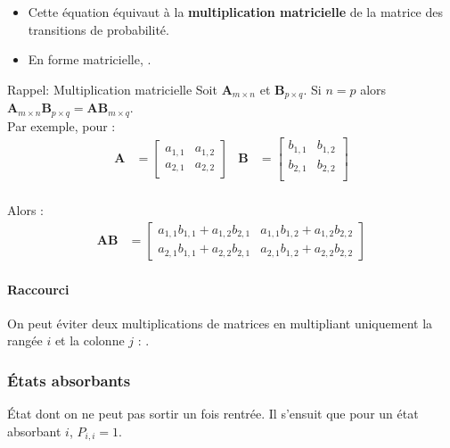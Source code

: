 \documentclass[10pt, french]{article}
\begin{document}
\begin{multicols*}{2}
\begin{definitionNOHFILLprop}
\begin{itemize}
	\item	Cette équation équivaut à la \textbf{multiplication matricielle} de la matrice des transitions de probabilité.
	\item	En forme matricielle, .
\end{itemize}
\end{definitionNOHFILLprop}

\begin{rappel}{Rappel: Multiplication matricielle}
Soit $\bm{A}_{m \times n}$ et $\bm{B}_{p \times q}$. Si $n = p$ alors $\bm{A}_{m \times n} \bm{B}_{p \times q} = \bm{AB}_{m \times q}$.\\

Par exemple, pour :
\begin{align*}
	\bm{A}
	&=	\begin{bmatrix}
		a_{1, 1}	&	a_{1, 2}	\\
		a_{2, 1}	&	a_{2, 2}	
		\end{bmatrix}	&
	\bm{B}
	&=	\begin{bmatrix}
		b_{1, 1}	&	b_{1, 2}	\\
		b_{2, 1}	&	b_{2, 2}	\\
		\end{bmatrix}	\\	
\end{align*}

Alors : 
\begin{align*}
	\bm{AB}
	&=	\begin{bmatrix}
		a_{1, 1}b_{1, 1} + a_{1, 2}b_{2, 1}	&	a_{1, 1}b_{1, 2} + a_{1, 2}b_{2, 2}	\\
		a_{2, 1}b_{1, 1} + a_{2, 2}b_{2, 1}	&	a_{2, 1}b_{1, 2} + a_{2, 2}b_{2, 2}	
		\end{bmatrix}	
\end{align*}
\end{rappel}


\paragraph{Raccourci}	On peut éviter deux multiplications de matrices en multipliant uniquement la rangée $i$ et la colonne $j$ : .


\subsubsection{États absorbants}
\begin{definitionNOHFILLsub}
État dont on ne peut pas sortir un fois rentrée. Il s'ensuit que pour un état absorbant $i$, $P_{i, i} = 1$.


\end{definitionNOHFILLsub}
\end{multicols*}
\end{document}
